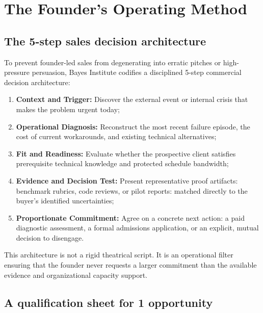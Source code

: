 \section{The Founder's Operating Method}

\subsection{The 5-step sales decision architecture}

To prevent founder-led sales from degenerating into erratic pitches or high-pressure persuasion, Bayes Institute codifies a disciplined 5-step commercial decision architecture:
\begin{enumerate}
\item \textbf{Context and Trigger:} Discover the external event or internal crisis that makes the problem urgent today;
\item \textbf{Operational Diagnosis:} Reconstruct the most recent failure episode, the cost of current workarounds, and existing technical alternatives;
\item \textbf{Fit and Readiness:} Evaluate whether the prospective client satisfies prerequisite technical knowledge and protected schedule bandwidth;
\item \textbf{Evidence and Decision Test:} Present representative proof artifacts: benchmark rubrics, code reviews, or pilot reports: matched directly to the buyer's identified uncertainties;
\item \textbf{Proportionate Commitment:} Agree on a concrete next action: a paid diagnostic assessment, a formal admissions application, or an explicit, mutual decision to disengage.
\end{enumerate}
This architecture is not a rigid theatrical script. It is an operational filter ensuring that the founder never requests a larger commitment than the available evidence and organizational capacity support.

\subsection{A qualification sheet for 1 opportunity}

